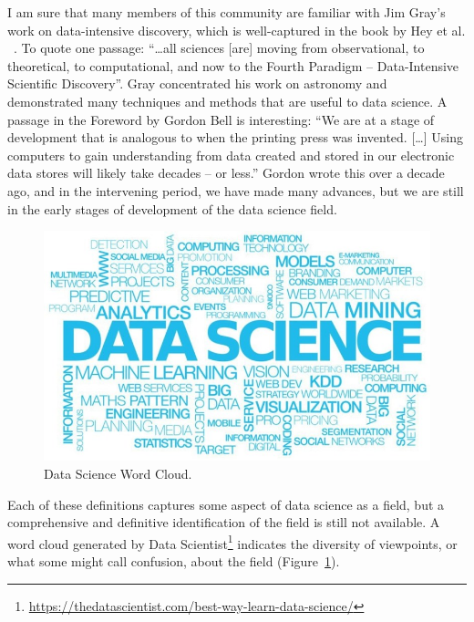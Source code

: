\documentclass[11pt]{article}
\begin{document}
I am sure that many members of this community are familiar with Jim Gray's work on data-intensive discovery, which is well-captured in the book by Hey et al. ~\cite{hey2009the}. To quote one passage: ``\ldots all sciences [are] moving from observational, to theoretical, to computational, and now to the Fourth Paradigm – Data-Intensive Scientific Discovery''. Gray concentrated his work on astronomy and demonstrated many techniques and methods that are useful to data science. A passage in the Foreword by Gordon Bell is interesting: ``We are at a stage of development that is analogous to when the printing press was invented. [\ldots] Using computers to gain understanding from data created and stored in our electronic data stores will likely take decades -- or less.'' Gordon wrote this over a decade ago, and in the intervening period, we have made many advances, but we are still in the early stages of development of the data science field.

\begin{figure}
\includegraphics[width=0.9\linewidth]{letters/Figures/data-science-wordcloud.jpeg}
\caption{Data Science Word Cloud.}
\label{fig:dscloud}
\end{figure}

Each of these definitions captures some aspect of data science as a field, but a comprehensive and definitive identification of the field is still not available. A word cloud generated by Data Scientist\footnote{\url{https://thedatascientist.com/best-way-learn-data-science/}} indicates the diversity of viewpoints, or what some might call confusion, about the field (Figure~\ref{fig:dscloud}).
\end{document}
